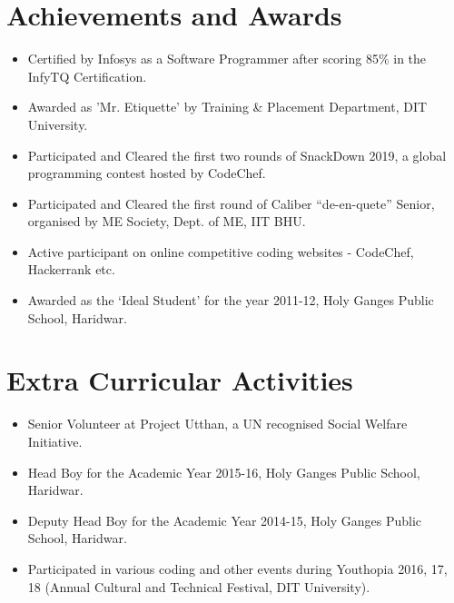 \documentclass[a4paper, margin, centered]{res}
\begin{document}
\begin{resume}
\begin{itemize}[leftmargin=*]
\end{itemize}


\section{Achievements and Awards}
\begin{itemize}[leftmargin=*]
 
\item Certified by Infosys as a Software Programmer after scoring 85\% in the InfyTQ Certification.
\item Awarded as 'Mr. Etiquette' by Training \& Placement Department, DIT University.
\item Participated and Cleared the first two rounds of SnackDown 2019, a global programming contest hosted by CodeChef.
\item Participated and Cleared the first round of Caliber “de-en-quete” Senior, organised by ME Society, Dept. of ME, IIT BHU.
\item Active participant on online competitive coding websites - CodeChef, Hackerrank etc.
\item Awarded as the ‘Ideal Student’ for the year 2011-12, Holy Ganges Public School, Haridwar.
\end{itemize}
\section{Extra Curricular Activities}
\begin{itemize}[leftmargin=*]

\item Senior Volunteer at Project Utthan, a UN recognised Social Welfare Initiative.
\item Head Boy for the Academic Year  2015-16, Holy Ganges Public School, Haridwar.
\item Deputy Head Boy for the Academic Year  2014-15, Holy Ganges Public School, Haridwar.
\item Participated in various coding and other events during Youthopia 2016, 17, 18 (Annual Cultural and Technical Festival, DIT University).


\end{itemize}
\end{resume}
\end{document}
